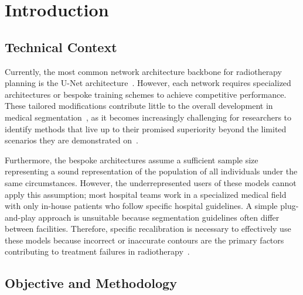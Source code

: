 \documentclass[11pt,twoside]{report}
\begin{document}


\setcounter{page}{1}
\fancyhead[LE,RO]{\slshape \rightmark}
\fancyhead[LO,RE]{\slshape \leftmark}

\chapter{Introduction}

\section{Technical Context}



Currently, the most common network architecture backbone for radiotherapy planning is the U-Net architecture~\cite{Samarasinghe2021-ps, Lin2021-oz, Sartor2020-et, LIU2020184, Rhee2020-ms, LIU2020172}. However, each network requires specialized architectures or bespoke training schemes to achieve competitive performance. These tailored modifications contribute little to the overall development in medical segmentation~\cite{isensee2024nnunet}, as it becomes increasingly challenging for researchers to identify methods that live up to their promised superiority beyond the limited scenarios they are demonstrated on~\cite{nnunet}.

Furthermore, the bespoke architectures assume a sufficient sample size representing a sound representation of the population of all individuals under the same circumstances. However, the underrepresented users of these models cannot apply this assumption; most hospital teams work in a specialized medical field with only in-house patients who follow specific hospital guidelines. A simple plug-and-play approach is unsuitable because segmentation guidelines often differ between facilities. Therefore, specific recalibration is necessary to effectively use these models because incorrect or inaccurate contours are the primary factors contributing to treatment failures in radiotherapy~\cite{Rhee2020-ms}.

\section{Objective and Methodology}
\end{document}
